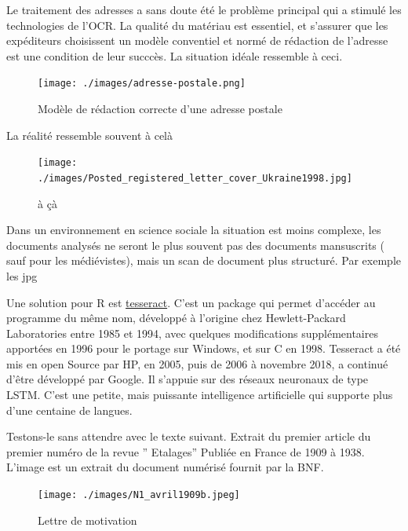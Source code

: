 \documentclass[
  letterpaper,
  DIV=11,
  numbers=noendperiod]{scrreprt}
\begin{document}
Le traitement des adresses a sans doute été le problème principal qui a
stimulé les technologies de l'OCR. La qualité du matériau est essentiel,
et s'assurer que les expéditeurs choisissent un modèle conventiel et
normé de rédaction de l'adresse est une condition de leur succcès. La
situation idéale ressemble à ceci.

\begin{figure}[H]

{\centering \texttt{[image: ./images/adresse-postale.png]}

}

\caption{Modèle de rédaction correcte d'une adresse postale}

\end{figure}%

La réalité ressemble souvent à celà

\begin{figure}[H]

{\centering \texttt{[image: ./images/Posted\_registered\_letter\_cover\_Ukraine1998.jpg]}

}

\caption{à çà}

\end{figure}%

Dans un environnement en science sociale la situation est moins
complexe, les documents analysés ne seront le plus souvent pas des
documents mansuscrits ( sauf pour les médiévistes), mais un scan de
document plus structuré. Par exemple les jpg

Une solution pour R est
\href{https://cran.r-project.org/web/packages/tesseract/vignettes/intro.html}{tesseract}.
C'est un package qui permet d'accéder au programme du même nom,
développé à l'origine chez Hewlett-Packard Laboratories entre 1985 et
1994, avec quelques modifications supplémentaires apportées en 1996 pour
le portage sur Windows, et sur C en 1998. Tesseract a été mis en open
Source par HP, en 2005, puis de 2006 à novembre 2018, a continué d'être
développé par Google. Il s'appuie sur des réseaux neuronaux de type
LSTM. C'est une petite, mais puissante intelligence artificielle qui
supporte plus d'une centaine de langues.

Testons-le sans attendre avec le texte suivant. Extrait du premier
article du premier numéro de la revue '' Etalages'' Publiée en France de
1909 à 1938. L'image est un extrait du document numérisé fournit par la
BNF.

\begin{figure}[H]

{\centering \texttt{[image: ./images/N1\_avril1909b.jpeg]}

}

\caption{Lettre de motivation}

\end{figure}%
\end{document}
